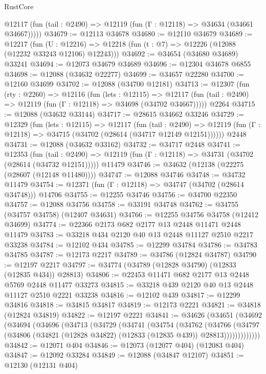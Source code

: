 \begin{lexlean}{RustCore}
\begin{coremodule}
      @12117 (fun (tail : @2490) => @12119 (fun (Γ : @12118) => @34634 (@34661 @34667)))))
@34679 := @12113 @34678
@34680 := @12110 @34679
@34689 := @12217
    (fun (U : @12216) => @12218 (fun (t : @7) => @12226 (@12088 (@12232 @33243 @12106) @12243)))
@34692 := @34654 (@34680 @34689) @33241
@34694 := @12073 @34679 @34689
@34696 := @12304 @34678 @6855
@34698 := @12088 (@34632 @22277)
@34699 := @34657 @22280
@34700 := @12160 @34699
@34702 := @12088 (@34700 @12181)
@34713 := @12307
    (fun (rty : @2260) =>
    @12116
      (fun (lets : @12115) =>
      @12117 (fun (tail : @2490) => @12119 (fun (Γ : @12118) => @34698 (@34702 @34667)))))
    @2264
@34715 := @12088 (@34632 @33144)
@34717 := @28615 @34662 @33246
@34729 := @12329
    (fun (lets : @12115) =>
    @12117
      (fun (tail : @2490) =>
      @12119 (fun (Γ : @12118) => @34715 (@34702 (@28614 (@34717 @12149 @12151))))))
    @2448
@34731 := @12088 (@34632 @33162)
@34732 := @34717 @2448
@34741 := @12353
    (fun (tail : @2490) => @12119 (fun (Γ : @12118) => @34731 (@34702 (@28614 (@34732 @12151)))))
    @11479
@34746 := @34632 (@12138 (@22275 (@28607 (@12148 @11480))))
@34747 := @12088 @34746
@34748 := @34732 @11479
@34754 := @12371 (fun (Γ : @12118) => @34747 (@34702 (@28614 @34748))) @14706
@34755 := @12255 @34746
@34756 := @34700 @22350
@34757 := @12088 @34756
@34758 := @33191 @34748
@34762 := @34755 (@34757 @34758) (@12407 @34631)
@34766 := @12255 @34756 @34758 (@12412 @34699)
@34774 := @22366 @2173 @682 @2177 @13 @2448 @11471 @2448 @11479
@34783 := @33218 @434 @2120 @40 @13 @2448 @11127 @2510 @2217 @33238
@34784 := @12102 @434
@34785 := @12299 @34784
@34786 := @34783 @34785
@34787 := @12173 @2217
@34789 := @34786 (@12824 @34787)
@34790 := @12197 @2217
@34797 := @34774 (@34789 (@12828 @34790) (@12833 (@12835 @434)) @28813)
@34806 := @22453 @11471 @682 @2177 @13 @2448 @5769 @2448 @11477 @33273
@34815 := @33218 @439 @2120 @40 @13 @2448 @11127 @2510 @2221 @33238
@34816 := @12102 @439
@34817 := @12299 @34816
@34818 := @34815 @34817
@34819 := @12173 @2221
@34821 := @34818 (@12824 @34819)
@34822 := @12197 @2221
@34841 := @34626
    (@34651
      (@34692
        (@34694
          (@34696
            (@34713
              (@34729
                (@34741
                  (@34754
                    (@34762
                      (@34766
                        (@34797
                          (@34806 (@34821 (@12828 @34822) (@12833 (@12835 @439)) @28813)))))))))))))
@34842 := @12071 @404
@34846 := @12073 (@12077 @404) (@12083 @404)
@34847 := @12092 @33284
@34849 := @12088 (@34847 @12107)
@34851 := @12130 (@12131 @404)

\end{coremodule}
\end{lexlean}
